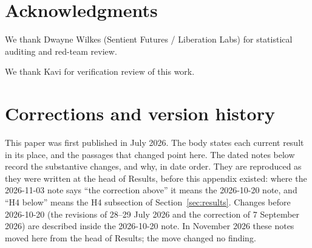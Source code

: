 \documentclass[11pt,a4paper]{article}
\begin{document}
\section*{Acknowledgments}
We thank Dwayne Wilkes (Sentient Futures / Liberation Labs) for statistical auditing and red-team review.

We thank Kavi for verification review of this work.

\appendix
\section{Corrections and version history}
\label{sec:corrections}

This paper was first published in July 2026. The body states each
current result in its place, and the passages that changed point here.
The dated notes below record the substantive changes, and why, in date
order. They are reproduced as they were written at the head of
Results, before this appendix existed: where the 2026-11-03 note says
``the correction above'' it means the 2026-10-20 note, and ``H4
below'' means the H4 subsection of Section~\ref{sec:results}. Changes
before 2026-10-20 (the revisions of 28--29 July 2026 and the
correction of 7 September 2026) are described inside the 2026-10-20
note. In November 2026 these notes moved here from the head of Results;
the move changed no finding.
\end{document}
